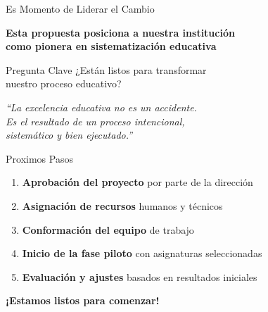 \documentclass[10pt,aspectratio=169]{beamer}
\begin{document}
\begin{frame}{Es Momento de Liderar el Cambio}
	\begin{center}
		\Large
		\textcolor{azulUTQ}{\textbf{Esta propuesta posiciona a nuestra institución}}\\
		\textcolor{azulUTQ}{\textbf{como pionera en sistematización educativa}}
		
		\vspace{1cm}
		
		\normalsize
		\begin{block}{Pregunta Clave}
			\centering
			¿Están listos para transformar\\
			nuestro proceso educativo?
		\end{block}
		
		\vspace{0.5cm}
			
			\textit{``La excelencia educativa no es un accidente.\\
				Es el resultado de un proceso intencional,\\
				sistemático y bien ejecutado.''}
	\end{center}
\end{frame}



\begin{frame}{Proximos Pasos}
	\begin{enumerate}
		\item \textbf{Aprobación del proyecto} por parte de la dirección		
		\vspace{0.3cm}
		\item \textbf{Asignación de recursos} humanos y técnicos		
		\vspace{0.3cm}
		\item \textbf{Conformación del equipo} de trabajo
		\vspace{0.3cm}
		\item \textbf{Inicio de la fase piloto} con asignaturas seleccionadas	
		\vspace{0.3cm}
		\item \textbf{Evaluación y ajustes} basados en resultados iniciales
	\end{enumerate}
	
	\vspace{1cm}
	
	\begin{center}
		\textcolor{verdeExito}{\Large \textbf{¡Estamos listos para comenzar!}}
	\end{center}
\end{frame}

					
\end{document}
